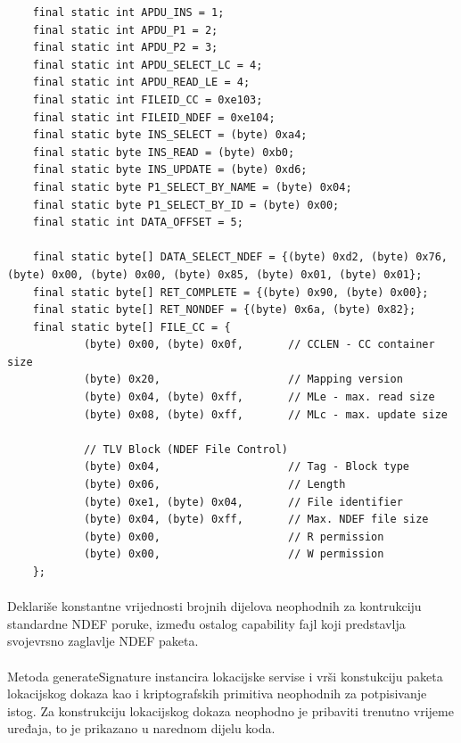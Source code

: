 \begin{verbatim}
    final static int APDU_INS = 1;
    final static int APDU_P1 = 2;
    final static int APDU_P2 = 3;
    final static int APDU_SELECT_LC = 4;
    final static int APDU_READ_LE = 4;
    final static int FILEID_CC = 0xe103;
    final static int FILEID_NDEF = 0xe104;
    final static byte INS_SELECT = (byte) 0xa4;
    final static byte INS_READ = (byte) 0xb0;
    final static byte INS_UPDATE = (byte) 0xd6;
    final static byte P1_SELECT_BY_NAME = (byte) 0x04;
    final static byte P1_SELECT_BY_ID = (byte) 0x00;
    final static int DATA_OFFSET = 5;

    final static byte[] DATA_SELECT_NDEF = {(byte) 0xd2, (byte) 0x76, (byte) 0x00, (byte) 0x00, (byte) 0x85, (byte) 0x01, (byte) 0x01};
    final static byte[] RET_COMPLETE = {(byte) 0x90, (byte) 0x00};
    final static byte[] RET_NONDEF = {(byte) 0x6a, (byte) 0x82};
    final static byte[] FILE_CC = {
            (byte) 0x00, (byte) 0x0f,       // CCLEN - CC container size
            (byte) 0x20,                    // Mapping version
            (byte) 0x04, (byte) 0xff,       // MLe - max. read size
            (byte) 0x08, (byte) 0xff,       // MLc - max. update size

            // TLV Block (NDEF File Control)
            (byte) 0x04,                    // Tag - Block type
            (byte) 0x06,                    // Length
            (byte) 0xe1, (byte) 0x04,       // File identifier
            (byte) 0x04, (byte) 0xff,       // Max. NDEF file size
            (byte) 0x00,                    // R permission
            (byte) 0x00,                    // W permission
    };
\end{verbatim}

\paragraph*{}
Deklariše konstantne vrijednosti brojnih dijelova neophodnih za kontrukciju standardne NDEF poruke, između ostalog capability fajl koji predstavlja svojevrsno zaglavlje NDEF paketa.

\paragraph*{}
Metoda generateSignature instancira lokacijske servise i vrši konstukciju paketa lokacijskog dokaza kao i kriptografskih primitiva neophodnih za potpisivanje istog. Za konstrukciju lokacijskog dokaza neophodno je pribaviti trenutno vrijeme uređaja, to je prikazano u narednom dijelu koda.

